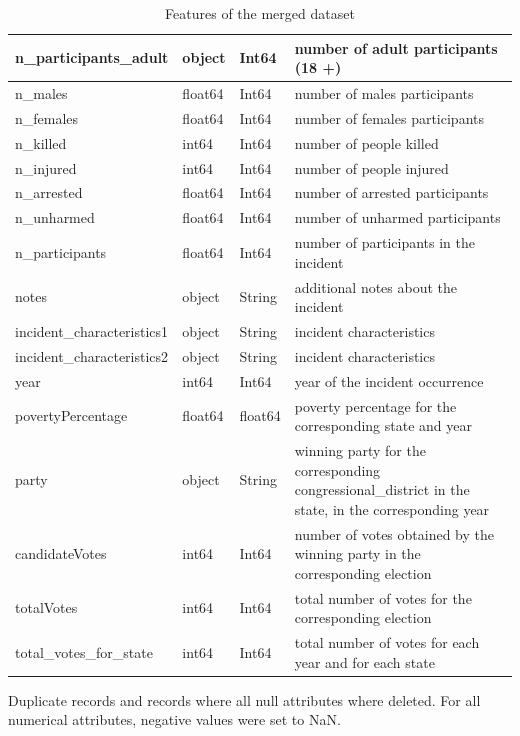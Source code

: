 \documentclass[10pt,a4paper]{report}
\begin{document}
\begin{table}[t]
\begin{small}
\begin{tabular}{|l|l|l|p{7.7cm}|}
		\hline
		n\_participants\_adult & object & Int64 & number of adult participants (18 +)\\
		\hline
		n\_males & float64 & Int64 & number of males participants\\
		\hline
		n\_females & float64 & Int64 & number of females participants\\
		\hline
		n\_killed & int64 & Int64 & number of people killed\\
		\hline
		n\_injured & int64 & Int64 & number of people injured\\
		\hline
		n\_arrested & float64 & Int64 & number of arrested participants\\
		\hline
		n\_unharmed & float64 & Int64 & number of unharmed participants\\
		\hline
		n\_participants & float64 & Int64 & number of participants in the incident\\
		\hline
		notes & object & String & additional notes about the incident\\
		\hline
		incident\_characteristics1 & object & String & incident characteristics\\
		\hline
		incident\_characteristics2 & object & String & incident characteristics\\
		\hline
		year & int64 & Int64 & year of the incident occurrence\\
		\hline
		povertyPercentage & float64 & float64 & poverty percentage for the corresponding state and year\\
		\hline
		party & object & String & winning party for the corresponding congressional\_district in the state, in the corresponding year\\
		\hline
		candidateVotes & int64 & Int64 & number of votes obtained by the winning party in the corresponding election\\
		\hline
		totalVotes & int64 & Int64 & total number of votes for the corresponding election\\
		\hline
		total\_votes\_for\_state & int64 & Int64 & total number of votes for each year and for each state\\
		\hline
	\end{tabular}
	\end{small}
	\caption{Features of the merged dataset}
	\label{table01}
\end{table}

Duplicate records and records where all null attributes where deleted.
For all numerical attributes, negative values were set to NaN.
\end{document}
